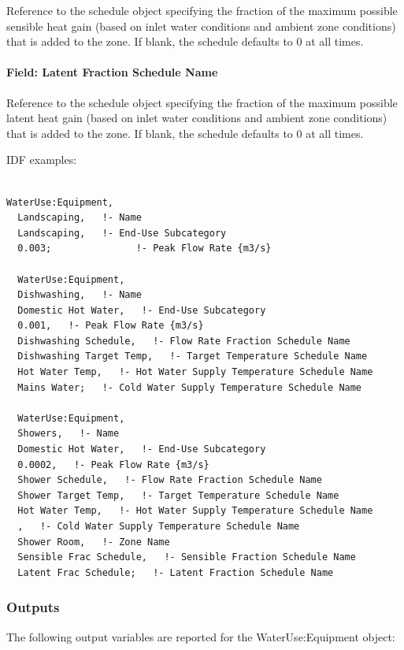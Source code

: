 Reference to the schedule object specifying the fraction of the maximum possible sensible heat gain (based on inlet water conditions and ambient zone conditions) that is added to the zone. If blank, the schedule defaults to 0 at all times.

\paragraph{Field: Latent Fraction Schedule Name}\label{field-latent-fraction-schedule-name}

Reference to the schedule object specifying the fraction of the maximum possible latent heat gain (based on inlet water conditions and ambient zone conditions) that is added to the zone. If blank, the schedule defaults to 0 at all times.

IDF examples:

\begin{lstlisting}

WaterUse:Equipment,
  Landscaping,   !- Name
  Landscaping,   !- End-Use Subcategory
  0.003;               !- Peak Flow Rate {m3/s}

  WaterUse:Equipment,
  Dishwashing,   !- Name
  Domestic Hot Water,   !- End-Use Subcategory
  0.001,   !- Peak Flow Rate {m3/s}
  Dishwashing Schedule,   !- Flow Rate Fraction Schedule Name
  Dishwashing Target Temp,   !- Target Temperature Schedule Name
  Hot Water Temp,   !- Hot Water Supply Temperature Schedule Name
  Mains Water;   !- Cold Water Supply Temperature Schedule Name

  WaterUse:Equipment,
  Showers,   !- Name
  Domestic Hot Water,   !- End-Use Subcategory
  0.0002,   !- Peak Flow Rate {m3/s}
  Shower Schedule,   !- Flow Rate Fraction Schedule Name
  Shower Target Temp,   !- Target Temperature Schedule Name
  Hot Water Temp,   !- Hot Water Supply Temperature Schedule Name
  ,   !- Cold Water Supply Temperature Schedule Name
  Shower Room,   !- Zone Name
  Sensible Frac Schedule,   !- Sensible Fraction Schedule Name
  Latent Frac Schedule;   !- Latent Fraction Schedule Name
\end{lstlisting}

\subsubsection{Outputs}\label{outputs-041}

The following output variables are reported for the WaterUse:Equipment object:

